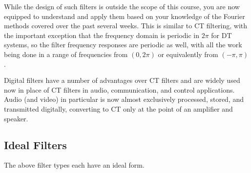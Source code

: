 While the design of such filters is outside the scope of this course, you are now equipped to understand and apply them based on your knowledge of the Fourier methods covered over the past several weeks. This is similar to CT filtering, with the important exception that the frequency domain is periodic in $2\pi$ for DT systems, so the filter frequency responses are periodic as well, with all the work being done in a range of frequencies from $(0,2\pi)$ or equivalently from $(-\pi,\pi)$. 

Digital filters have a number of advantages over CT filters and are widely used now in place of CT filters in audio, communication, and control applications. Audio (and video) in particular is now almost exclusively processed, stored, and transmitted digitally, converting to CT only at the point of an amplifier and speaker. 

\subsection{Ideal Filters}

The above filter types each have an ideal form.

